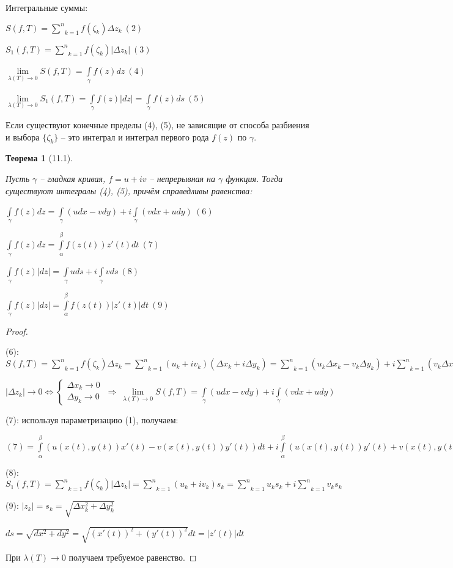 \documentclass[draft]{article}
\newcommand{\forcenewline}{$\phantom{\mbox{newline}}$\newline}
\newcommand{\then}{\ \Rightarrow\ }
\newcommand{\mint}[2]{\underset{#1}{\overset{#2}{\int}}}
\newcommand{\msum}[2]{\underset{#1}{\overset{#2}{\sum}}}
\newcommand{\mlim}[1]{\underset{#1}{\lim}}
\newcommand{\LRA}{\Leftrightarrow}
\renewcommand{\a}{\alpha}
\renewcommand{\b}{\beta}
\newcommand{\g}{\gamma}
\renewcommand{\l}{\lambda}
\newcommand{\D}{\Delta}
\newcommand{\sys}[1]{\left\{\begin{matrix}#1\end{matrix}\right.}
\newtheorem*{theor}{Теорема}
\theoremstyle{remark}
\begin{document}
Интегральные суммы:

$S(f,T)=\msum{k=1}{n}f(\zeta_k)\D z_k\ (2)$

$S_1(f,T)=\msum{k=1}{n}f(\zeta_k)|\D z_k|\ (3)$

$\mlim{\l(T)\to 0}S(f,T)=\mint{\g}{} f(z)dz\ (4)$

$\mlim{\l(T)\to 0}S_1(f,T)=\mint{\g}{} f(z)|dz|=\mint{\g}{} f(z)ds\ (5)$

Если существуют конечные пределы (4), (5), не зависящие от способа разбиения и выбора $\{\zeta_k\}$ -- это интеграл и интеграл первого рода $f(z)$ по $\g$.

\begin{theor}[11.1]
\forcenewline

Пусть $\g$ -- гладкая кривая, $f=u+iv$ -- непрерывная на $\g$ функция. Тогда существуют интегралы (4), (5), причём справедливы равенства:

$\mint{\g}{}f(z)dz=\mint{\g}{}(udx-vdy)+i\mint{\g}{}(vdx+udy)\ (6)$

$\mint{\g}{}f(z)dz=\mint{\a}{\b}f(z(t))z'(t)dt\ (7)$

$\mint{\g}{}f(z)|dz|=\mint{\g}{}uds+i\mint{\g}{}vds\ (8)$

$\mint{\g}{}f(z)|dz|=\mint{\a}{\b}f(z(t))|z'(t)|dt\ (9)$
\end{theor}
\begin{proof}
\forcenewline

(6): $S(f,T)=\msum{k=1}{n}f(\zeta_k)\D z_k=\msum{k=1}{n}(u_k+iv_k)(\D x_k+i\D y_k)=\msum{k=1}{n}(u_k\D x_k-v_k\D y_k)+i\msum{k=1}{n}(v_k\D x_k+u_k\D y_k)$

$|\D z_k|\to 0 \LRA\sys{\D x_k\to 0 \\ \D y_k\to 0}\then \mlim{\l(T)\to 0}S(f,T)=\mint{\g}{}(udx-vdy)+i\mint{\g}{}(vdx+udy)$

(7): используя параметризацию (1), получаем:

$(7)=\mint\a\b(u(x(t),y(t))x'(t)-v(x(t),y(t))y'(t))dt+i\mint\a\b(u(x(t),y(t))y'(t)+v(x(t),y(t))x'(t))dt=\mint\a\b(u+iv)(x'+iy')=\mint\a\b f(z(t))z'(t)dt$

(8): $S_1(f,T)=\msum{k=1}{n}f(\zeta_k)|\D z_k|=\msum{k=1}{n}(u_k+iv_k)s_k=\msum{k=1}{n}u_ks_k+i\msum{k=1}{n}v_ks_k$

(9): $|z_k|=s_k=\sqrt{\D x_k^2+\D y_k^2}$

$ds=\sqrt{dx^2+dy^2}=\sqrt{(x'(t))^2+(y'(t))^2}dt=|z'(t)|dt$

При $\l(T)\to 0$ получаем требуемое равенство.
\end{proof}
\end{document}

